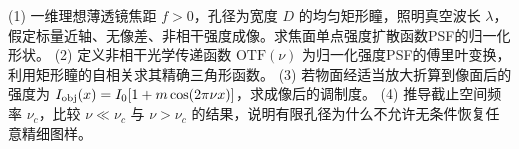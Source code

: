 (1) 一维理想薄透镜焦距 \(f>0\)，孔径为宽度 \(D\) 的均匀矩形瞳，照明真空波长 \(\lambda\)，假定标量近轴、无像差、非相干强度成像。求焦面单点强度扩散函数PSF的归一化形状。
(2) 定义非相干光学传递函数 \(\mathrm{OTF}(\nu)\) 为归一化强度PSF的傅里叶变换，利用矩形瞳的自相关求其精确三角形函数。
(3) 若物面经适当放大折算到像面后的强度为 \(I_{\rm obj}(x)=I_0[1+m\cos(2\pi\nu x)]\)，求成像后的调制度。
(4) 推导截止空间频率 \(\nu_c\)，比较 \(\nu\ll\nu_c\) 与 \(\nu>\nu_c\) 的结果，说明有限孔径为什么不允许无条件恢复任意精细图样。
